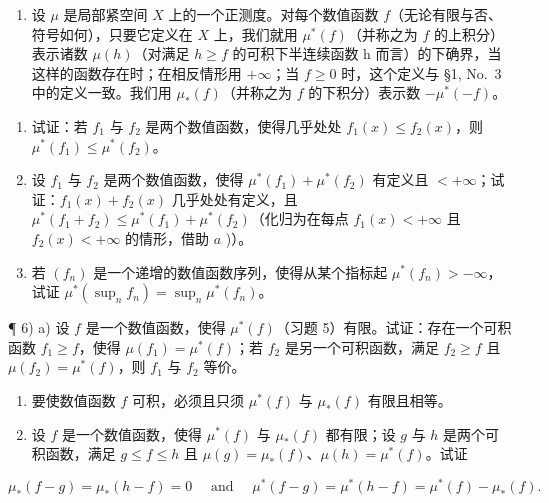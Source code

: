 \begin{enumerate}
\def\labelenumi{\arabic{enumi})}
\setcounter{enumi}{4}
\tightlist
\item
  设 \(\mu\) 是局部紧空间 \(X\) 上的一个正测度。对每个数值函数 \(f\)（无论有限与否、符号如何），只要它定义在 \(X\) 上，我们就用 \(\mu^{*}(f)\)（并称之为 \(f\) 的上积分）表示诸数 \(\mu(h)\)（对满足 \(h \geqslant f\) 的可积下半连续函数 h 而言）的下确界，当这样的函数存在时；在相反情形用 \(+\infty\)；当 \(f \geqslant 0\) 时，这个定义与 §1, No.~3 中的定义一致。我们用 \(\mu_{*}(f)\)（并称之为 \(f\) 的下积分）表示数 \(-\mu^{*}(-f)\)。
\end{enumerate}

\begin{enumerate}
\def\labelenumi{\alph{enumi})}
\item
  试证：若 \(f_{1}\) 与 \(f_{2}\) 是两个数值函数，使得几乎处处 \(f_{1}(x) \leqslant f_{2}(x)\)，则 \(\mu^{*}(f_{1}) \leqslant \mu^{*}(f_{2})\)。
\item
  设 \(f_{1}\) 与 \(f_{2}\) 是两个数值函数，使得 \(\mu^{*}(f_{1}) + \mu^{*}(f_{2})\) 有定义且 \(< +\infty\)；试证：\(f_{1}(x) + f_{2}(x)\) 几乎处处有定义，且 \(\mu^{*}(f_{1} + f_{2}) \leqslant \mu^{*}(f_{1}) + \mu^{*}(f_{2})\)（化归为在每点 \(f_{1}(x) < +\infty\) 且 \(f_{2}(x) < +\infty\) 的情形，借助 \(a\) )）。
\item
  若 \((f_n)\) 是一个递增的数值函数序列，使得从某个指标起 \(\mu^{*}(f_{n}) > -\infty\)，试证 \(\mu^{*}(\sup_{n} f_{n}) = \sup_{n} \mu^{*}(f_{n})\)。
\end{enumerate}

¶ 6) a) 设 \(f\) 是一个数值函数，使得 \(\mu^{*}(f)\)（习题 5）有限。试证：存在一个可积函数 \(f_{1} \geqslant f\)，使得 \(\mu(f_{1}) = \mu^{*}(f)\)；若 \(f_{2}\) 是另一个可积函数，满足 \(f_{2} \geqslant f\) 且 \(\mu(f_{2}) = \mu^{*}(f)\)，则 \(f_{1}\) 与 \(f_{2}\) 等价。

\begin{enumerate}
\def\labelenumi{\alph{enumi})}
\setcounter{enumi}{1}
\item
  要使数值函数 \(f\) 可积，必须且只须 \(\mu^{*}(f)\) 与 \(\mu_{*}(f)\) 有限且相等。
\item
  设 \(f\) 是一个数值函数，使得 \(\mu^{*}(f)\) 与 \(\mu_{*}(f)\) 都有限；设 \(g\) 与 \(h\) 是两个可积函数，满足 \(g \leqslant f \leqslant h\) 且 \(\mu(g) = \mu_{*}(f)\)、\(\mu(h) = \mu^{*}(f)\)。试证
\end{enumerate}

\[
\mu_ {*} (f - g) = \mu_ {*} (h - f) = 0 \quad \text { and } \quad \mu^ {*} (f - g) = \mu^ {*} (h - f) = \mu^ {*} (f) - \mu_ {*} (f).
\]

